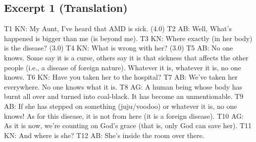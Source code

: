 \documentclass[output=paper,colorlinks,citecolor=brown]{langscibook}
\begin{document}
\subsection{Excerpt 1 (Translation)}

\begin{exe}
     T1 KN: My Aunt, I’ve heard that AMD is sick. (4.0)
     T2 AB: Well, What’s happened is bigger than me (is beyond me).
     T3 KN: Where exactly (in her body) is the disease? (3.0) 
     T4 KN: What is wrong with her? (3.0)
     T5 AB: No one knows. Some say it is a curse, others say it is that sickness that affects the other people (i.e., a disease of foreign nature). Whatever it is, whatever it is, no one knows.
     T6 KN: Have you taken her to the hospital?
     T7 AB: We’ve taken her everywhere. No one knows what it is.
     T8 AG: A human being whose body has burnt all over and turned into coal-black. It has become an unmentionable.
     T9 AB: If she has stepped on something (juju/voodoo) or whatever it is, no one knows! As for this disease, it is not from here (it is a foreign disease).
     T10 AG: As it is now, we’re counting on God’s grace (that is, only God can save her).
     T11 KN: And where is she?
     T12 AB: She's inside the room over there.
\end{exe}

\end{document}
